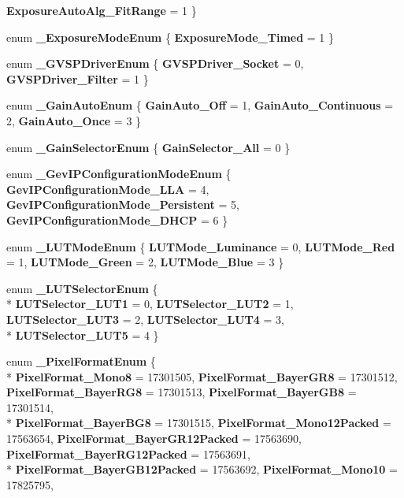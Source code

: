 \begin{DoxyCompactItemize}
{\bfseries Exposure\-Auto\-Alg\-\_\-\-Fit\-Range} = 1
 \}
\item 
enum {\bfseries \-\_\-\-Exposure\-Mode\-Enum} \{ {\bfseries Exposure\-Mode\-\_\-\-Timed} = 1
 \}
\item 
enum {\bfseries \-\_\-\-G\-V\-S\-P\-Driver\-Enum} \{ {\bfseries G\-V\-S\-P\-Driver\-\_\-\-Socket} = 0, 
{\bfseries G\-V\-S\-P\-Driver\-\_\-\-Filter} = 1
 \}
\item 
enum {\bfseries \-\_\-\-Gain\-Auto\-Enum} \{ {\bfseries Gain\-Auto\-\_\-\-Off} = 1, 
{\bfseries Gain\-Auto\-\_\-\-Continuous} = 2, 
{\bfseries Gain\-Auto\-\_\-\-Once} = 3
 \}
\item 
enum {\bfseries \-\_\-\-Gain\-Selector\-Enum} \{ {\bfseries Gain\-Selector\-\_\-\-All} = 0
 \}
\item 
enum {\bfseries \-\_\-\-Gev\-I\-P\-Configuration\-Mode\-Enum} \{ {\bfseries Gev\-I\-P\-Configuration\-Mode\-\_\-\-L\-L\-A} = 4, 
{\bfseries Gev\-I\-P\-Configuration\-Mode\-\_\-\-Persistent} = 5, 
{\bfseries Gev\-I\-P\-Configuration\-Mode\-\_\-\-D\-H\-C\-P} = 6
 \}
\item 
enum {\bfseries \-\_\-\-L\-U\-T\-Mode\-Enum} \{ {\bfseries L\-U\-T\-Mode\-\_\-\-Luminance} = 0, 
{\bfseries L\-U\-T\-Mode\-\_\-\-Red} = 1, 
{\bfseries L\-U\-T\-Mode\-\_\-\-Green} = 2, 
{\bfseries L\-U\-T\-Mode\-\_\-\-Blue} = 3
 \}
\item 
enum {\bfseries \-\_\-\-L\-U\-T\-Selector\-Enum} \{ \\*
{\bfseries L\-U\-T\-Selector\-\_\-\-L\-U\-T1} = 0, 
{\bfseries L\-U\-T\-Selector\-\_\-\-L\-U\-T2} = 1, 
{\bfseries L\-U\-T\-Selector\-\_\-\-L\-U\-T3} = 2, 
{\bfseries L\-U\-T\-Selector\-\_\-\-L\-U\-T4} = 3, 
\\*
{\bfseries L\-U\-T\-Selector\-\_\-\-L\-U\-T5} = 4
 \}
\item 
enum {\bfseries \-\_\-\-Pixel\-Format\-Enum} \{ \\*
{\bfseries Pixel\-Format\-\_\-\-Mono8} = 17301505, 
{\bfseries Pixel\-Format\-\_\-\-Bayer\-G\-R8} = 17301512, 
{\bfseries Pixel\-Format\-\_\-\-Bayer\-R\-G8} = 17301513, 
{\bfseries Pixel\-Format\-\_\-\-Bayer\-G\-B8} = 17301514, 
\\*
{\bfseries Pixel\-Format\-\_\-\-Bayer\-B\-G8} = 17301515, 
{\bfseries Pixel\-Format\-\_\-\-Mono12\-Packed} = 17563654, 
{\bfseries Pixel\-Format\-\_\-\-Bayer\-G\-R12\-Packed} = 17563690, 
{\bfseries Pixel\-Format\-\_\-\-Bayer\-R\-G12\-Packed} = 17563691, 
\\*
{\bfseries Pixel\-Format\-\_\-\-Bayer\-G\-B12\-Packed} = 17563692, 
{\bfseries Pixel\-Format\-\_\-\-Mono10} = 17825795, 

\end{DoxyCompactItemize}
